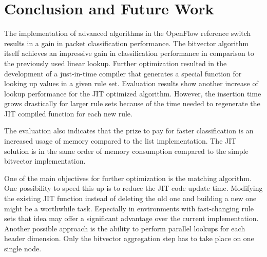 \documentclass[conference]{IEEEtran}
\begin{document}
\section{Conclusion and Future Work}
The implementation of advanced algorithms in the OpenFlow reference switch 
results in a gain in packet classification performance.
The bitvector algorithm itself achieves an impressive gain in classification 
performance in comparison to the previously used linear lookup.
Further optimization resulted in the development of a just-in-time compiler 
that generates a special function for looking up values in a given rule set.
Evaluation results show another increase of lookup performance for the JIT optimized algorithm.
However, the insertion time grows drastically for larger rule sets because 
of the time needed to regenerate the JIT compiled function for each new rule.

The evaluation also indicates that the prize to pay for faster classification 
is an increased usage of memory compared to the list implementation.
The JIT solution is in the same order of memory consumption 
compared to the simple bitvector implementation. 

One of the main objectives for further optimization is the matching algorithm.
One possibility to speed this up is to reduce the JIT code update time.
Modifying the existing JIT function instead of deleting the old one and building 
a new one might be a worthwhile task.
Especially in environments with fast-changing rule sets that idea may offer 
a significant advantage over the current implementation.
Another possible approach is the ability to perform parallel lookups for each header dimension.
Only the bitvector aggregation step has to take place on one single node.


\balance

\end{document}
